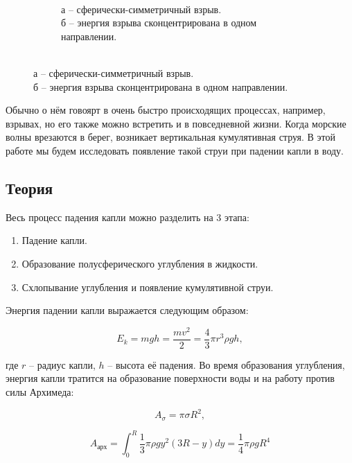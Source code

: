 \documentclass[a4paper, 12pt]{article}
\begin{document}
\begin{figure}[H]
\begin{subfigure}{0.5\textwidth}
        \caption*{\\а -- сферически-симметричный взрыв.\\
                 б -- энергия взрыва сконцентрирована в одном
                 направлении.}
    \end{subfigure}
\end{figure}

Обычно о нём говоярт в очень быстро происходящих процессах, например,
взрывах, но его также можно встретить и в повседневной жизни.
Когда морские волны врезаются в берег, возникает вертикальная
кумулятивная струя. В этой работе мы будем исследовать появление такой
струи при падении капли в воду.

\begin{center}
    \item \section*{Теория}
\end{center}

Весь процесс падения капли можно разделить на 3 этапа:

\bigskip

\begin{enumerate}
    \item Падение капли.
    \item Образование полусферического углубления в жидкости.
    \item Схлопывание углубления и появление кумулятивной струи.
\end{enumerate}

\bigskip

Энергия падении капли выражается следующим образом:

\begin{equation}
    E_k = mgh = \frac{mv^2}{2} = \frac{4}{3}\pi{r^3}{\rho}gh,
\end{equation}

где $r$ -- радиус капли, $h$ -- высота её падения.
Во время образования углубления, энергия капли тратится на образование
поверхности воды и на работу против силы Архимеда:

\begin{equation}
    A_\sigma = \pi{\sigma}R^2,
\end{equation}

\begin{equation}
    A_\text{арх} = \int_{0}^{R} \frac{1}{3}{\pi}{\rho}gy^2(3R-y)dy = 
    \frac{1}{4}\pi{\rho}gR^4
\end{equation}
\end{document}
